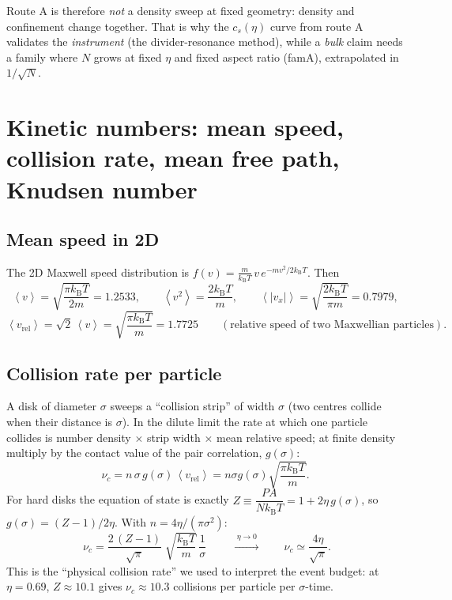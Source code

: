\documentclass[11pt,a4paper]{article}
\newcommand{\kT}{k_{\mathrm B}T}
\newcommand{\avg}[1]{\left\langle #1 \right\rangle}
\begin{document}
\begin{why}
Route A is therefore \emph{not} a density sweep at fixed geometry: density and confinement change together. That is why the $c_s(\eta)$ curve from route A validates the \emph{instrument} (the divider-resonance method), while a \emph{bulk} claim needs a family where $N$ grows at fixed $\eta$ and fixed aspect ratio (famA), extrapolated in $1/\sqrt N$.
\end{why}

\section{Kinetic numbers: mean speed, collision rate, mean free path, Knudsen number}

\subsection{Mean speed in 2D}
The 2D Maxwell speed distribution is $f(v) = \frac{m}{\kT}\,v\,e^{-mv^2/2\kT}$. Then
\begin{equation}
\avg{v} = \sqrt{\frac{\pi \kT}{2m}} = 1.2533,\qquad
\avg{v^2} = \frac{2\kT}{m},\qquad
\avg{|v_x|} = \sqrt{\frac{2\kT}{\pi m}} = 0.7979,
\end{equation}
\begin{equation}
\avg{v_{\mathrm{rel}}} = \sqrt2\,\avg{v} = \sqrt{\frac{\pi\kT}{m}} = 1.7725
\qquad(\text{relative speed of two Maxwellian particles}).
\end{equation}

\subsection{Collision rate per particle}
A disk of diameter $\sigma$ sweeps a ``collision strip'' of width $\sigma$ (two centres collide when their distance is $\sigma$). In the dilute limit the rate at which one particle collides is number density $\times$ strip width $\times$ mean relative speed; at finite density multiply by the contact value of the pair correlation, $g(\sigma)$:
\begin{equation}
\nu_c = n\,\sigma\, g(\sigma)\,\avg{v_{\mathrm{rel}}}
= n\sigma g(\sigma)\sqrt{\frac{\pi\kT}{m}} .
\end{equation}
For hard disks the equation of state is exactly $Z \equiv \dfrac{PA}{N\kT} = 1 + 2\eta\, g(\sigma)$, so $g(\sigma) = (Z-1)/2\eta$. With $n = 4\eta/(\pi\sigma^2)$:
\begin{equation}
\boxed{\;\nu_c = \frac{2\,(Z-1)}{\sqrt\pi}\;\sqrt{\frac{\kT}{m}}\,\frac1\sigma\;}
\qquad\xrightarrow{\;\eta\to0\;}\qquad \nu_c \simeq \frac{4\eta}{\sqrt\pi}.
\label{eq:nuc}
\end{equation}
This is the ``physical collision rate'' we used to interpret the event budget: at $\eta = 0.69$, $Z \approx 10.1$ gives $\nu_c \approx 10.3$ collisions per particle per $\sigma$-time.
\end{document}
